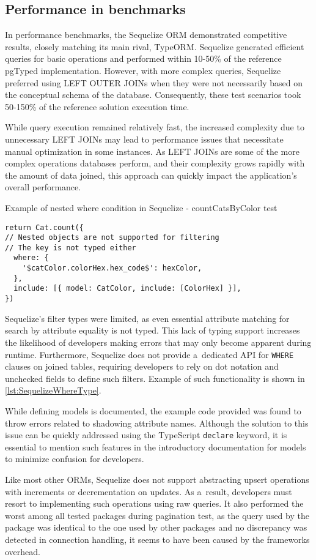 \subsection*{Performance in benchmarks}

In performance benchmarks, the Sequelize ORM demonstrated competitive results,
closely matching its main rival, TypeORM. Sequelize generated efficient queries
for basic operations and performed within 10-50\% of the reference pgTyped
implementation. However, with more complex queries, Sequelize preferred using
LEFT OUTER JOINs when they were not necessarily based on the conceptual schema
of the database. Consequently, these test scenarios took 50-150\% of the
reference solution execution time.

While query execution remained relatively fast, the increased complexity due to
unnecessary LEFT JOINs may lead to performance issues that necessitate manual
optimization in some instances. As LEFT JOINs are some of the more complex
operations databases perform, and their complexity grows rapidly with the amount
of data joined, this approach can quickly impact the application's overall
performance.

\begin{listing}
    \caption{Example of nested where condition in Sequelize - \mbox{countCatsByColor} test}
    \label{lst:SequelizeWhereType}
\begin{verbatim}
return Cat.count({
// Nested objects are not supported for filtering
// The key is not typed either
  where: {
    '$catColor.colorHex.hex_code$': hexColor,
  },
  include: [{ model: CatColor, include: [ColorHex] }],
})
    \end{verbatim}
\end{listing}

Sequelize's filter types were limited, as even essential attribute matching for
search by attribute equality is not typed. This lack of typing support increases
the likelihood of developers making errors that may only become apparent during
runtime. Furthermore, Sequelize does not provide a~dedicated API for
\texttt{WHERE} clauses on joined tables, requiring developers to rely on dot
notation and unchecked fields to define such filters. Example of such
functionality is shown in \autoref{lst:SequelizeWhereType}.

While defining models is documented, the example code provided was found to
throw errors related to shadowing attribute names. Although the solution to this
issue can be quickly addressed using the TypeScript \texttt{declare} keyword, it is
essential to mention such features in the introductory documentation for models
to minimize confusion for developers.

Like most other ORMs, Sequelize does not support abstracting upsert operations
with increments or decrementation on updates. As a~result, developers must
resort to implementing such operations using raw queries. It also performed the
worst among all tested packages during pagination test, as the query used by the
package was identical to the one used by other packages and no discrepancy was
detected in connection handling, it seems to have been caused by the frameworks
overhead.
